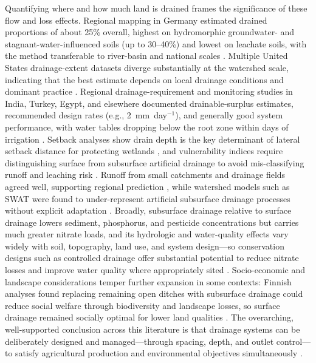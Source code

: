 \documentclass[11pt]{article}
\begin{document}
Quantifying where and how much land is drained frames the significance of these
flow and loss effects. Regional mapping in Germany estimated drained proportions
of about 25\% overall, highest on hydromorphic groundwater- and
stagnant-water-influenced soils (up to 30--40\%) and lowest on leachate soils,
with the method transferable to river-basin and national scales
\parencite{Hirt2005,Hirt2011}. Multiple United States drainage-extent datasets
diverge substantially at the watershed scale, indicating that the best estimate
depends on local drainage conditions and dominant practice
\parencite{Jame2022}. Regional drainage-requirement and monitoring studies in
India, Turkey, Egypt, and elsewhere documented drainable-surplus estimates,
recommended design rates (e.g., 2~mm~day$^{-1}$), and generally good system
performance, with water tables dropping below the root zone within days of
irrigation \parencite{Kumar2006,Güngör2023,Ali2001,MartínezBeltrán2007,Rimidis2003}.
Setback analyses show drain depth is the key determinant of lateral setback
distance for protecting wetlands \parencite{Tangen2018}, and vulnerability
indices require distinguishing surface from subsurface artificial drainage to
avoid mis-classifying runoff and leaching risk \parencite{Baffaut2020}. Runoff
from small catchments and drainage fields agreed well, supporting regional
prediction \parencite{Veinbergs2022}, while watershed models such as SWAT were
found to under-represent artificial subsurface drainage processes without
explicit adaptation \parencite{Manguerra1998,Golmohammadi2016}. Broadly,
subsurface drainage relative to surface drainage lowers sediment, phosphorus, and
pesticide concentrations but carries much greater nitrate loads, and its
hydrologic and water-quality effects vary widely with soil, topography, land use,
and system design---so conservation designs such as controlled drainage offer
substantial potential to reduce nitrate losses and improve water quality where
appropriately sited \parencite{Blann2009,Gramlich2018,FAUSEY1995,SKAGGS1994}.
Socio-economic and landscape considerations temper further expansion in some
contexts: Finnish analyses found replacing remaining open ditches with subsurface
drainage could reduce social welfare through biodiversity and landscape losses,
so surface drainage remained socially optimal for lower land qualities
\parencite{HietalaKoivu2004,Saikkonen2014}. The overarching, well-supported
conclusion across this literature is that drainage systems can be deliberately
designed and managed---through spacing, depth, and outlet control---to satisfy
agricultural production and environmental objectives simultaneously
\parencite{Skaggs1995,Breve1998,ElSadek2002b,Strock2011,Ritzema2016}.

\printbibliography
\end{document}
